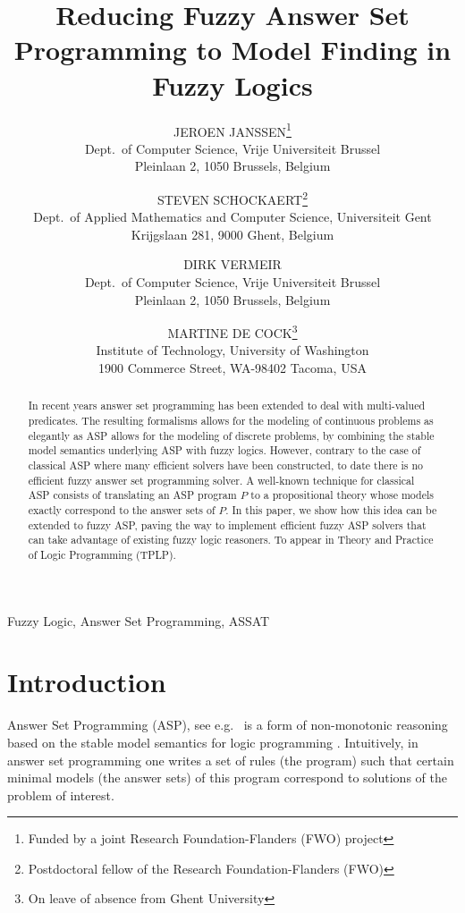 \documentclass{tlp}
\title{Reducing Fuzzy Answer Set Programming to Model Finding in Fuzzy Logics}
\author[Jeroen Janssen, Steven Schockaert, Dirk Vermeir and Martine De Cock]{JEROEN JANSSEN\thanks{Funded by a joint Research Foundation-Flanders (FWO) project}\\Dept.~of Computer Science, Vrije Universiteit Brussel\\Pleinlaan 2, 1050 Brussels, Belgium\\
       \email{jeroen.janssen@vub.ac.be}
       \and STEVEN SCHOCKAERT\thanks{Postdoctoral fellow of the Research Foundation-Flanders (FWO)}\\Dept.~of Applied Mathematics and Computer Science, Universiteit Gent\\Krijgslaan 281, 9000 Ghent, Belgium\\
	\email{steven.schockaert@ugent.be}
       \and DIRK VERMEIR\\Dept.~of Computer Science, Vrije Universiteit Brussel\\Pleinlaan 2, 1050 Brussels, Belgium\\
	\email{dirk.vermeir@vub.ac.be}
       \and MARTINE DE COCK\thanks{On leave of absence from Ghent University}\\Institute of Technology, University of Washington\\1900 Commerce Street, WA-98402 Tacoma, USA\\
	\email{mdecock@u.washington.edu}}
\begin{document}
\maketitle

\begin{abstract}
 In recent years answer set programming has been extended to deal with multi-valued predicates. The resulting formalisms
allows for the modeling of continuous problems as elegantly as ASP allows for the modeling of discrete problems, by combining the
stable model semantics underlying ASP with fuzzy logics. However, contrary to the case of classical ASP where many
efficient solvers have been constructed, to date there is no efficient fuzzy answer set programming solver. A well-known
technique for classical ASP consists of translating an ASP program $P$ to a propositional theory whose models exactly
correspond to the answer sets of $P$. In this paper, we show how this idea can be extended to fuzzy ASP, paving the way
to implement efficient fuzzy ASP solvers that can take advantage of existing fuzzy logic reasoners. To appear
in Theory and Practice of Logic Programming (TPLP).
\end{abstract}

\begin{keywords}
 Fuzzy Logic, Answer Set Programming, ASSAT
\end{keywords}

\section{Introduction}

Answer Set Programming (ASP), see e.g.~\cite{BaralBook} is a form of non-monotonic reasoning based on the stable model semantics for logic programming \cite{gelfondl88}. Intuitively, in answer set programming one writes a set of rules (the program) such that certain minimal models (the answer sets) of this program correspond to solutions of the problem of interest.
\end{document}
